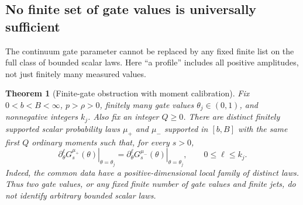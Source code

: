 \documentclass[11pt,letterpaper]{article}
\newtheorem{theorem}{Theorem}[section]
\theoremstyle{definition}
\theoremstyle{remark}
\newcommand{\1}{\mathbf 1}
\begin{document}
\subsection{No finite set of gate values is universally sufficient}

The continuum gate parameter cannot be replaced by any fixed finite list
on the full class of bounded scalar laws. Here ``a profile'' includes all
positive amplitudes, not just finitely many measured values.

\begin{theorem}[Finite-gate obstruction with moment calibration]
\label{p07:thm:finite-gate-obstruction}
Fix $0<b<B<\infty$, $p>\rho>0$, finitely many gate values
$\theta_j\in(0,1)$, and nonnegative integers $k_j$. Also fix an integer
$Q\geq0$. There are distinct finitely supported scalar probability laws
$\mu_+$ and $\mu_-$ supported in $[b,B]$ with the same first $Q$ ordinary
moments such that, for every $s>0$,
\begin{equation}\label{p07:eq:finite-gate-equality}
 \left.\partial_\theta^\ell G_s^{\mu_+}(\theta)\right|_{\theta=\theta_j}
 =\left.\partial_\theta^\ell G_s^{\mu_-}(\theta)\right|_{\theta=\theta_j},
 \qquad 0\leq\ell\leq k_j.
\end{equation}
Indeed, the common data have a positive-dimensional local family of
distinct laws. Thus two gate values, or any fixed finite number of gate
values and finite jets, do not identify arbitrary bounded scalar laws.
\end{theorem}
\end{document}
